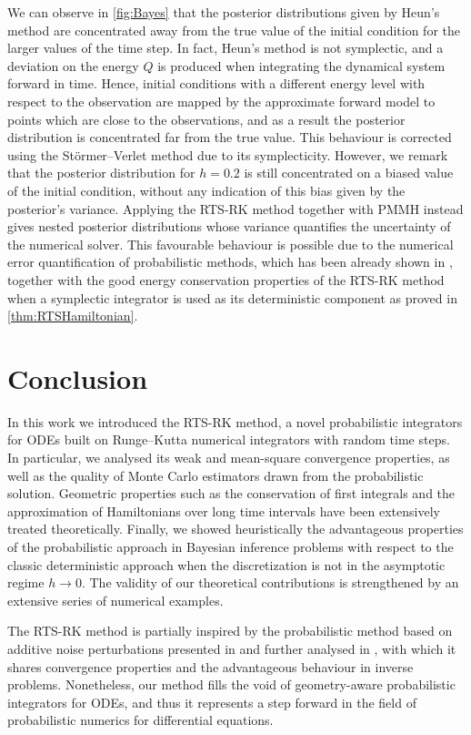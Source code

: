 \documentclass[10pt]{article}
\begin{document}
We can observe in \cref{fig:Bayes} that the posterior distributions given by Heun's method are concentrated away from the true value of the initial condition for the larger values of the time step. In fact, Heun's method is not symplectic, and a deviation on the energy $Q$ is produced when integrating the dynamical system forward in time. Hence, initial conditions with a different energy level with respect to the observation are mapped by the approximate forward model to points which are close to the observations, and as a result the posterior distribution is concentrated far from the true value. This behaviour is corrected using the Störmer--Verlet method due to its symplecticity. However, we remark that the posterior distribution for $h = 0.2$ is still concentrated on a biased value of the initial condition, without any indication of this bias given by the posterior's variance. Applying the RTS-RK method together with PMMH instead gives nested posterior distributions whose variance quantifies the uncertainty of the numerical solver. This favourable behaviour is possible due to the numerical error quantification of probabilistic methods, which has been already shown in \cite{CGS17, COS17}, together with the good energy conservation properties of the RTS-RK method when a symplectic integrator is used as its deterministic component as proved in \cref{thm:RTSHamiltonian}.

\section{Conclusion}

In this work we introduced the RTS-RK method, a novel probabilistic integrators for ODEs built on Runge--Kutta numerical integrators {with random time steps}. In particular, we analysed its weak and mean-square convergence properties, as well as the quality of Monte Carlo estimators drawn from the probabilistic solution. Geometric properties such as the conservation of first integrals and the approximation of Hamiltonians over long time intervals have been extensively treated theoretically. Finally, we showed heuristically the advantageous properties of the probabilistic approach in Bayesian inference problems with respect to the classic deterministic approach when the discretization is not in the asymptotic regime $h \to 0$. The validity of our theoretical contributions is strengthened by an extensive series of numerical examples.

The RTS-RK method is partially inspired by the probabilistic method based on additive noise perturbations presented in \cite{CGS17} and further analysed in \cite{LSS19b}, with which it shares convergence properties and the advantageous behaviour in inverse problems. Nonetheless, our method fills the void of geometry-aware probabilistic integrators for ODEs, and thus it represents a step forward in the field of probabilistic numerics for differential equations.
\end{document}
